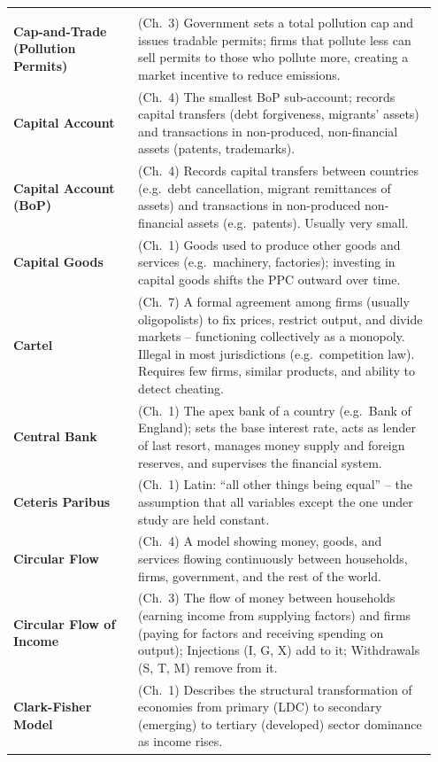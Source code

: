 \documentclass[11pt, a4paper, twoside]{book}
\begin{document}
\begin{longtable}{@{}>{\RaggedRight\arraybackslash}p{0.28\linewidth}>{\RaggedRight\arraybackslash}p{0.67\linewidth}@{}}
\multicolumn{2}{@{}l}{\textbf{\Large\color{CurveNavy} C}} \\[2pt]
\textbf{Cap-and-Trade (Pollution Permits)} & (Ch.~3) Government sets a total pollution cap and issues tradable permits; firms that pollute less can sell permits to those who pollute more, creating a market incentive to reduce emissions. \\
\textbf{Capital Account} & (Ch.~4) The smallest BoP sub-account; records capital transfers (debt forgiveness, migrants' assets) and transactions in non-produced, non-financial assets (patents, trademarks). \\
\textbf{Capital Account (BoP)} & (Ch.~4) Records capital transfers between countries (e.g.\ debt cancellation, migrant remittances of assets) and transactions in non-produced non-financial assets (e.g.\ patents). Usually very small. \\
\textbf{Capital Goods} & (Ch.~1) Goods used to produce other goods and services (e.g.\ machinery, factories); investing in capital goods shifts the PPC outward over time. \\
\textbf{Cartel} & (Ch.~7) A formal agreement among firms (usually oligopolists) to fix prices, restrict output, and divide markets -- functioning collectively as a monopoly. Illegal in most jurisdictions (e.g.\ competition law). Requires few firms, similar products, and ability to detect cheating. \\
\textbf{Central Bank} & (Ch.~1) The apex bank of a country (e.g.\ Bank of England); sets the base interest rate, acts as lender of last resort, manages money supply and foreign reserves, and supervises the financial system. \\
\textbf{Ceteris Paribus} & (Ch.~1) Latin: ``all other things being equal'' -- the assumption that all variables except the one under study are held constant. \\
\textbf{Circular Flow} & (Ch.~4) A model showing money, goods, and services flowing continuously between households, firms, government, and the rest of the world. \\
\textbf{Circular Flow of Income} & (Ch.~3) The flow of money between households (earning income from supplying factors) and firms (paying for factors and receiving spending on output); Injections (I, G, X) add to it; Withdrawals (S, T, M) remove from it. \\
\textbf{Clark-Fisher Model} & (Ch.~1) Describes the structural transformation of economies from primary (LDC) to secondary (emerging) to tertiary (developed) sector dominance as income rises. \\

\end{longtable}
\end{document}
